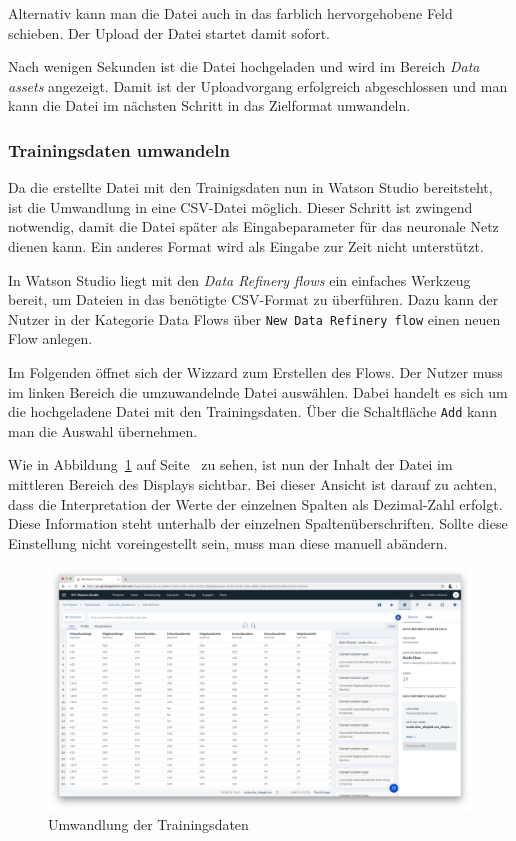 Alternativ kann man die Datei auch in das farblich hervorgehobene Feld schieben. Der Upload der Datei startet damit
sofort.

Nach wenigen Sekunden ist die Datei hochgeladen und wird im Bereich \textit{Data assets} angezeigt. Damit ist der
Uploadvorgang erfolgreich abgeschlossen und man kann die Datei im nächsten Schritt in das Zielformat umwandeln.

\subsubsection{Trainingsdaten umwandeln}
Da die erstellte Datei mit den Trainigsdaten nun in Watson Studio bereitsteht, ist die Umwandlung in eine CSV-Datei
möglich. Dieser Schritt ist zwingend notwendig, damit die Datei später als Eingabeparameter für das neuronale Netz
dienen kann. Ein anderes Format wird als Eingabe zur Zeit nicht unterstützt.

In Watson Studio liegt mit den \textit{Data Refinery flows} ein einfaches Werkzeug bereit, um Dateien in das benötigte
CSV-Format zu überführen. Dazu kann der Nutzer in der Kategorie Data Flows über \texttt{New Data Refinery flow} einen
neuen Flow anlegen.

Im Folgenden öffnet sich der Wizzard zum Erstellen des Flows. Der Nutzer muss im linken Bereich die umzuwandelnde Datei
auswählen. Dabei handelt es sich um die hochgeladene Datei mit den Trainingsdaten. Über die Schaltfläche \texttt{Add}
kann man die Auswahl übernehmen.

Wie in Abbildung~\ref{fig:umsetzung_data_flow} auf Seite~\pageref{fig:umsetzung_data_flow} zu sehen, ist nun der Inhalt
der Datei im mittleren Bereich des Displays sichtbar. Bei dieser Ansicht ist darauf zu achten, dass die Interpretation
der Werte der einzelnen Spalten als Dezimal-Zahl erfolgt. Diese Information steht unterhalb der einzelnen
Spaltenüberschriften. Sollte diese Einstellung nicht voreingestellt sein, muss man diese manuell abändern.

\begin{figure}[h]
    \centering
    \includegraphics[width=\textwidth]{images/kapitel_3/umsetzung_data_flow.png}
    \caption{Umwandlung der Trainingsdaten}
    \label{fig:umsetzung_data_flow}
\end{figure}

